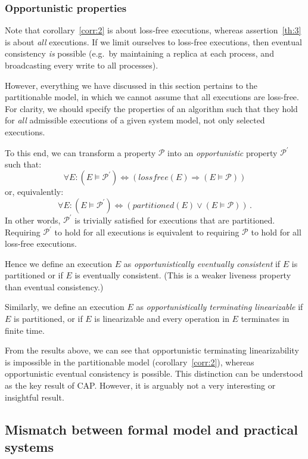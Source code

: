 \documentclass[a4paper,twocolumn,10pt]{article}
\begin{document}
\subsubsection{Opportunistic properties}

Note that corollary~\ref{corr:2} is about loss-free executions, whereas assertion~\ref{th:3} is
about \emph{all} executions. If we limit ourselves to loss-free executions, then eventual
consistency \emph{is} possible (e.g.\ by maintaining a replica at each process, and broadcasting
every write to all processes).

However, everything we have discussed in this section pertains to the partitionable model, in which
we cannot assume that all executions are loss-free. For clarity, we should specify the properties of
an algorithm such that they hold for \emph{all} admissible executions of a given system model, not
only selected executions.

To this end, we can transform a property $\mathcal{P}$ into an \emph{opportunistic} property
$\mathcal{P}^\prime$ such that:
$$\forall E \mathbin{:} (E \models \mathcal{P}^\prime) \Leftrightarrow (\mathit{lossfree}(E) \Rightarrow (E \models \mathcal{P}))$$
or, equivalently:
$$\forall E \mathbin{:} (E \models \mathcal{P}^\prime) \Leftrightarrow (\mathit{partitioned}(E) \vee (E \models \mathcal{P}))\,.$$
In other words, $\mathcal{P}^\prime$ is trivially satisfied for executions that are partitioned.
Requiring $\mathcal{P}^\prime$ to hold for all executions is equivalent to requiring $\mathcal{P}$
to hold for all loss-free executions.

Hence we define an execution $E$ as \emph{opportunistically eventually consistent} if $E$ is
partitioned or if $E$ is eventually consistent. (This is a weaker liveness property than eventual
consistency.)

Similarly, we define an execution $E$ as \emph{opportunistically terminating linearizable} if $E$ is
partitioned, or if $E$ is linearizable and every operation in $E$ terminates in finite time.

From the results above, we can see that opportunistic terminating linearizability is impossible in
the partitionable model (corollary~\ref{corr:2}), whereas opportunistic eventual consistency is
possible. This distinction can be understood as the key result of CAP. However, it is arguably not a
very interesting or insightful result.

\subsection{Mismatch between formal model and practical systems}
\end{document}
